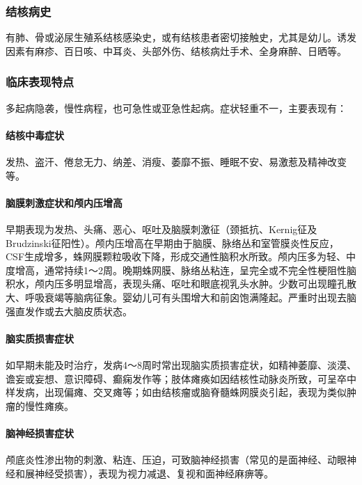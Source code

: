\subsubsection{结核病史}

有肺、骨或泌尿生殖系结核感染史，或有结核患者密切接触史，尤其是幼儿。诱发因素有麻疹、百日咳、中耳炎、头部外伤、结核病灶手术、全身麻醉、日晒等。

\subsubsection{临床表现特点}

多起病隐袭，慢性病程，也可急性或亚急性起病。症状轻重不一，主要表现有：

\paragraph{结核中毒症状}

发热、盗汗、倦怠无力、纳差、消瘦、萎靡不振、睡眠不安、易激惹及精神改变等。

\paragraph{脑膜刺激症状和颅内压增高}

早期表现为发热、头痛、恶心、呕吐及脑膜刺激征（颈抵抗、Kernig征及Brudzinski征阳性）。颅内压增高在早期由于脑膜、脉络丛和室管膜炎性反应，CSF生成增多，蛛网膜颗粒吸收下降，形成交通性脑积水所致。颅内压多为轻、中度增高，通常持续1～2周。晚期蛛网膜、脉络丛粘连，呈完全或不完全性梗阻性脑积水，颅内压多明显增高，表现头痛、呕吐和眼底视乳头水肿。少数可出现瞳孔散大、呼吸衰竭等脑病征象。婴幼儿可有头围增大和前囟饱满隆起。严重时出现去脑强直发作或去大脑皮质状态。

\paragraph{脑实质损害症状}

如早期未能及时治疗，发病4～8周时常出现脑实质损害症状，如精神萎靡、淡漠、谵妄或妄想、意识障碍、癫痫发作等；肢体瘫痪如因结核性动脉炎所致，可呈卒中样发病，出现偏瘫、交叉瘫等；如由结核瘤或脑脊髓蛛网膜炎引起，表现为类似肿瘤的慢性瘫痪。

\paragraph{脑神经损害症状}

颅底炎性渗出物的刺激、粘连、压迫，可致脑神经损害（常见的是面神经、动眼神经和展神经受损害），表现为视力减退、复视和面神经麻痹等。

